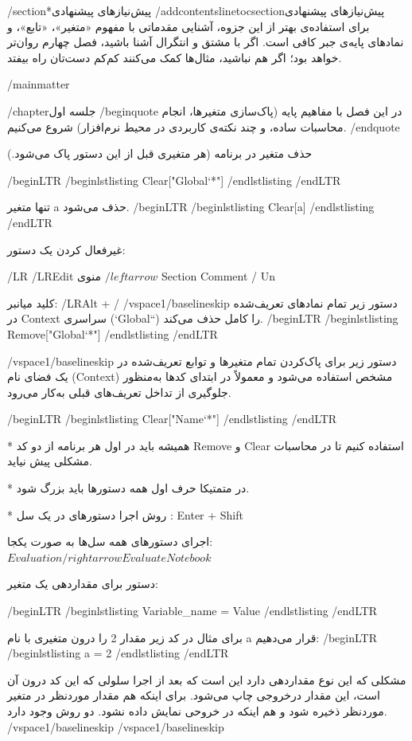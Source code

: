 /section*{پیش‌نیازهای پیشنهادی}
/addcontentsline{toc}{section}{پیش‌نیازهای پیشنهادی}
برای استفاده‌ی بهتر از این جزوه، آشنایی مقدماتی با مفهوم «متغیر»، «تابع»، و نمادهای پایه‌ی جبر کافی است. اگر با مشتق و انتگرال آشنا باشید، فصل چهارم روان‌تر خواهد بود؛ اگر هم نباشید، مثال‌ها کمک می‌کنند کم‌کم دست‌تان راه بیفتد.

/mainmatter

/chapter{جلسه اول}
/begin{quote}
در این فصل با مفاهیم پایه (پاک‌سازی متغیرها، انجام محاسبات ساده، و چند نکته‌ی کاربردی در محیط نرم‌افزار) شروع می‌کنیم.
/end{quote}



حذف متغیر در برنامه (هر متغیری قبل از این دستور پاک می‌شود.)

/begin{LTR}
/begin{lstlisting}
Clear["Global`*"]
/end{lstlisting}
/end{LTR}

تنها متغیر a حذف می‌شود.
/begin{LTR}
/begin{lstlisting}
Clear[a]
/end{lstlisting}
/end{LTR}

غیرفعال کردن یک دستور:

/LR{ /LR{Edit} منوی} $/leftarrow$ Section  Comment  /  Un 

کلید میانبر: /LR{Alt + /}
/vspace{1/baselineskip} 
دستور زیر تمام نمادهای تعریف‌شده در Context سراسری (`Global``) را کامل حذف می‌کند.
/begin{LTR}
/begin{lstlisting}
Remove["Global`*"]
/end{lstlisting}
/end{LTR}

/vspace{1/baselineskip} 
دستور زیر برای پاک‌کردن تمام متغیرها و توابع تعریف‌شده در یک فضای نام (Context) مشخص استفاده می‌شود و معمولاً در ابتدای کدها به‌منظور جلوگیری از تداخل تعریف‌های قبلی به‌کار می‌رود.

/begin{LTR}
/begin{lstlisting}
Clear["Name`*"]
/end{lstlisting}
/end{LTR}

* همیشه باید در اول هر برنامه از دو کد Remove  و Clear استفاده کنیم تا در محاسبات مشکلی پیش نیاید.

* در متمتیکا حرف اول همه دستورها باید بزرگ شود.

* روش اجرا دستورهای در یک سل :‌ Enter + Shift

اجرای دستورهای همه سل‌ها به صورت یکجا:
$Evaluation /rightarrow Evaluate Notebook$

دستور برای مقداردهی یک متغیر:

/begin{LTR}
/begin{lstlisting}
Variable_name = Value
/end{lstlisting}
/end{LTR}

برای مثال در کد زیر مقدار 2 را درون متغیری با نام a قرار می‌دهیم:
/begin{LTR}
/begin{lstlisting}
a = 2
/end{lstlisting}
/end{LTR}

مشکلی که این نوع مقداردهی دارد این است که بعد از اجرا سلولی که این کد درون آن است، این مقدار درخروجی چاپ می‌شود. برای اینکه هم مقدار موردنظر در متغیر موردنظر ذخیره شود و هم اینکه در خروحی نمایش داده نشود. دو روش وجود دارد.
/vspace{1/baselineskip} 
/vspace{1/baselineskip} 

